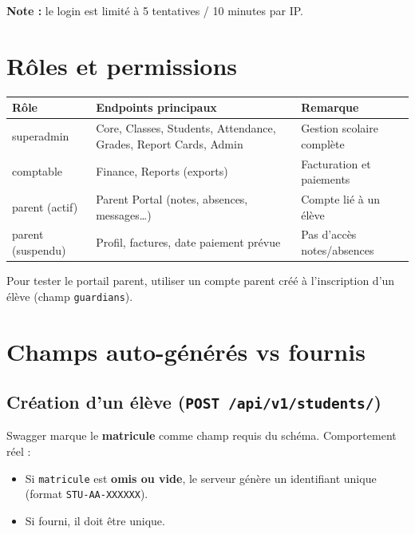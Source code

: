 \documentclass[11pt,a4paper]{article}
\begin{document}
\textbf{Note :} le login est limité à 5 tentatives / 10 minutes par IP.

\section{Rôles et permissions}

\begin{table}[h]
\centering
\begin{tabular}{lll}
\toprule
\textbf{Rôle} & \textbf{Endpoints principaux} & \textbf{Remarque} \\
\midrule
superadmin & Core, Classes, Students, Attendance, Grades, Report Cards, Admin & Gestion scolaire complète \\
comptable & Finance, Reports (exports) & Facturation et paiements \\
parent (actif) & Parent Portal (notes, absences, messages…) & Compte lié à un élève \\
parent (suspendu) & Profil, factures, date paiement prévue & Pas d'accès notes/absences \\
\bottomrule
\end{tabular}
\end{table}

Pour tester le portail parent, utiliser un compte parent créé à l'inscription d'un élève (champ \texttt{guardians}).

\section{Champs auto-générés vs fournis}

\subsection{Création d'un élève (\texttt{POST /api/v1/students/})}

Swagger marque le \textbf{matricule} comme champ requis du schéma. Comportement réel :
\begin{itemize}[noitemsep]
    \item Si \texttt{matricule} est \textbf{omis ou vide}, le serveur génère un identifiant unique (format \texttt{STU-AA-XXXXXX}).
    \item Si fourni, il doit être unique.
\end{itemize}
\end{document}
